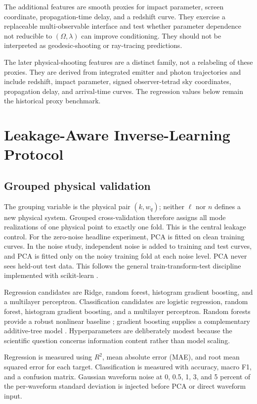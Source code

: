 \documentclass[conference]{IEEEtran}
\newcommand{\wq}{w_q}
\begin{document}
The additional features are smooth proxies for impact parameter, screen
coordinate, propagation-time delay, and a redshift curve. They exercise a
replaceable multi-observable interface and test whether parameter dependence
not reducible to $(\Omega,\lambda)$ can improve conditioning. They should not be
interpreted as geodesic-shooting or ray-tracing predictions.

The later physical-shooting features are a distinct family, not a relabeling
of these proxies. They are derived from integrated emitter and photon
trajectories and include redshift, impact parameter, signed observer-tetrad sky
coordinates, propagation delay, and arrival-time curves. The regression values
below remain the historical proxy benchmark.

\section{Leakage-Aware Inverse-Learning Protocol}
\subsection{Grouped physical validation}
The grouping variable is the physical pair $(k,\wq)$; neither $\ell$ nor $n$
defines a new physical system. Grouped cross-validation therefore assigns all
mode realizations of one physical point to exactly one fold. This is the central
leakage control. For the zero-noise headline experiment, PCA is fitted on clean
training curves. In the noise study, independent noise is added to training
and test curves, and PCA is fitted only on the noisy training fold at each
noise level. PCA never sees held-out test data. This follows the general
train-transform-test discipline implemented with scikit-learn
\cite{pedregosa2011scikit}.

Regression candidates are Ridge, random forest, histogram gradient boosting,
and a multilayer perceptron. Classification candidates are logistic regression,
random forest, histogram gradient boosting, and a multilayer perceptron.
Random forests provide a robust nonlinear baseline \cite{breiman2001random};
gradient boosting supplies a complementary additive-tree model
\cite{friedman2001greedy}. Hyperparameters are deliberately modest because the
scientific question concerns information content rather than model scaling.

Regression is measured using $R^2$, mean absolute error (MAE), and root mean
squared error for each target. Classification is measured with accuracy, macro
F1, and a confusion matrix. Gaussian waveform noise at 0, 0.5, 1, 3, and 5
percent of the per-waveform standard deviation is injected before PCA or direct
waveform input.
\end{document}
